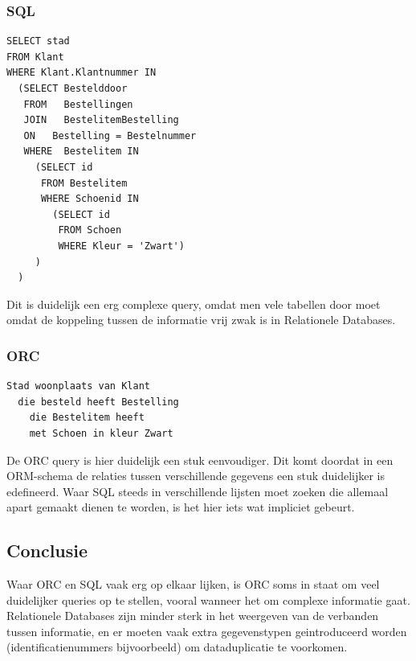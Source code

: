 \documentclass{article}
\begin{document}
\subsubsection{SQL}

\begin{verbatim}
SELECT stad
FROM Klant
WHERE Klant.Klantnummer IN 
  (SELECT Bestelddoor
   FROM   Bestellingen 
   JOIN   BestelitemBestelling
   ON   Bestelling = Bestelnummer
   WHERE  Bestelitem IN 
     (SELECT id 
      FROM Bestelitem
      WHERE Schoenid IN
        (SELECT id
         FROM Schoen
         WHERE Kleur = 'Zwart')
     )
  )   
\end{verbatim}

Dit is duidelijk een erg complexe query, omdat men vele tabellen door moet
omdat de koppeling tussen de informatie vrij zwak is in Relationele Databases.

\subsubsection{ORC}

\begin{verbatim}
Stad woonplaats van Klant 
  die besteld heeft Bestelling
    die Bestelitem heeft 
    met Schoen in kleur Zwart
\end{verbatim}

De ORC query is hier duidelijk een stuk eenvoudiger. Dit komt doordat in een
ORM-schema de relaties tussen verschillende gegevens een stuk duidelijker is
edefineerd. Waar SQL steeds in verschillende lijsten moet zoeken die allemaal
apart gemaakt dienen te worden, is het hier iets wat impliciet gebeurt.

\subsection{Conclusie} 

Waar ORC en SQL vaak erg op elkaar lijken, is ORC soms in staat om veel
duidelijker queries op te stellen, vooral wanneer het om complexe informatie
gaat. Relationele Databases zijn minder sterk in het weergeven van de verbanden
tussen informatie, en er moeten vaak extra gegevenstypen geintroduceerd worden
(identificatienummers bijvoorbeeld) om dataduplicatie te voorkomen.
\end{document}
